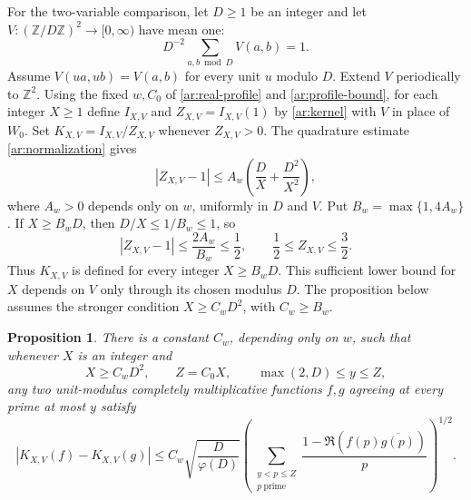 \documentclass[twoside]{aomart}
\theoremstyle{paperplain}
\newtheorem{proposition}[theorem]{Proposition}
\theoremstyle{paperdefinition}
\newcommand{\Z}{\mathbb Z}
\numberwithin{equation}{section}
\begin{document}
For the two-variable comparison, let $D\ge1$ be an integer and
let $V:(\Z/D\Z)^2\to[0,\infty)$ have mean one:
$$D^{-2}\sum_{a,b\bmod D}V(a,b)=1.$$
Assume $V(ua,ub)=V(a,b)$ for every unit $u$ modulo $D$.
Extend $V$ periodically to $\Z^2$.
Using the fixed $w,C_0$ of \eqref{ar:real-profile} and
\eqref{ar:profile-bound}, for each integer $X\ge1$ define
$I_{X,V}$ and $Z_{X,V}=I_{X,V}(1)$ by \eqref{ar:kernel}
with $V$ in place of $W_0$. Set $K_{X,V}=I_{X,V}/Z_{X,V}$
whenever $Z_{X,V}>0$.
The quadrature estimate \eqref{ar:normalization} gives
\begin{equation*}
 |Z_{X,V}-1|\le A_w\left(\frac DX+\frac{D^2}{X^2}\right),
 \end{equation*}
where $A_w>0$ depends only on $w$, uniformly in $D$ and $V$.
Put $B_w=\max\{1,4A_w\}$. If $X\ge B_wD$, then
$D/X\le1/B_w\le1$, so
\begin{equation}
 |Z_{X,V}-1|\le\frac{2A_w}{B_w}\le\frac12,
 \qquad \frac12\le Z_{X,V}\le\frac32.
 \label{con:kernel-positive-normalization}
\end{equation}
Thus $K_{X,V}$ is defined for every integer $X\ge B_wD$.
This sufficient lower bound for $X$ depends on $V$ only through
its chosen modulus $D$.
The proposition below assumes the stronger condition $X\ge C_wD^2$,
with $C_w\ge B_w$.

\begin{proposition}
\label{con:homogeneous-comparison}
There is a constant $C_w$, depending only on $w$, such that whenever
$X$ is an integer and
\begin{equation}
 X\ge C_wD^2,\qquad Z=C_0X,\qquad \max(2,D)\le y\le Z,
 \label{con:comparison-sizes}
\end{equation}
any two unit-modulus completely multiplicative functions $f,g$
agreeing at every prime at most $y$ satisfy
\begin{equation}
 |K_{X,V}(f)-K_{X,V}(g)|
 \le C_w\sqrt{\frac D{\varphi(D)}}
       \left(\sum_{\substack{y<p\le Z\\p\ \mathrm{prime}}}\frac{1-\Re(f(p)\overline{g(p)})}p\right)^{1/2}.
 \label{con:general-comparison}
\end{equation}
\end{proposition}
\end{document}
